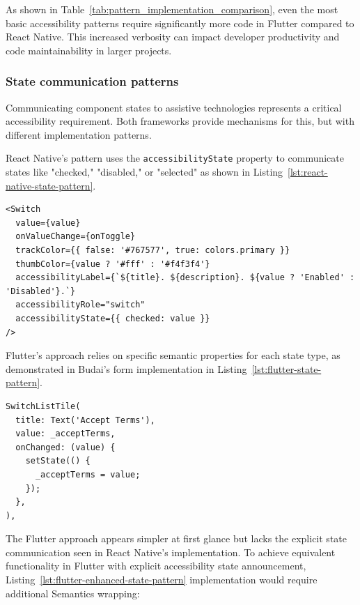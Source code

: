 \pagebreak

As shown in Table~\ref{tab:pattern_implementation_comparison}, even the most basic accessibility patterns require significantly more code in Flutter compared to React Native. This increased verbosity can impact developer productivity and code maintainability in larger projects.

\subsubsection{State communication patterns}
\label{subsubsec:state-communication-patterns}

Communicating component states to assistive technologies represents a critical accessibility requirement. Both frameworks provide mechanisms for this, but with different implementation patterns.

React Native's pattern uses the \texttt{accessibilityState} property to communicate states like "checked," "disabled," or "selected" as shown in Listing~\ref{lst:react-native-state-pattern}.

\begin{lstlisting}[style=ReactNativeStyle, caption=State communication in React Native, label=lst:react-native-state-pattern]
<Switch
  value={value}
  onValueChange={onToggle}
  trackColor={{ false: '#767577', true: colors.primary }}
  thumbColor={value ? '#fff' : '#f4f3f4'}
  accessibilityLabel={`${title}. ${description}. ${value ? 'Enabled' : 'Disabled'}.`}
  accessibilityRole="switch"
  accessibilityState={{ checked: value }}
/>
\end{lstlisting}

Flutter's approach relies on specific semantic properties for each state type, as demonstrated in Budai's form implementation in Listing~\ref{lst:flutter-state-pattern}.

\begin{lstlisting}[style=DartStyle, caption=State communication in Flutter, label=lst:flutter-state-pattern]
SwitchListTile(
  title: Text('Accept Terms'),
  value: _acceptTerms,
  onChanged: (value) {
    setState(() {
      _acceptTerms = value;
    });
  },
),
\end{lstlisting}

The Flutter approach appears simpler at first glance but lacks the explicit state communication seen in React Native's implementation. To achieve equivalent functionality in Flutter with explicit accessibility state announcement, Listing~\ref{lst:flutter-enhanced-state-pattern} implementation would require additional Semantics wrapping:

